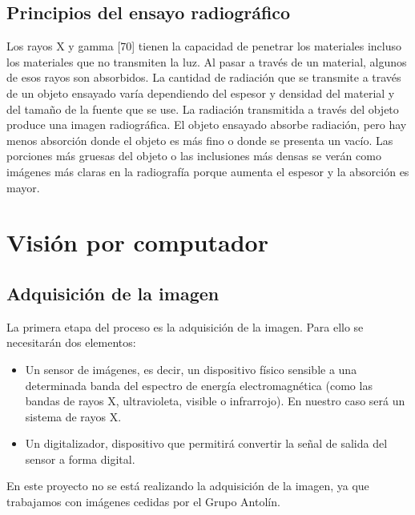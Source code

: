 \subsection{Principios del ensayo radiográfico}
Los rayos X y gamma [70] tienen la capacidad de penetrar los materiales incluso los materiales que no transmiten la luz. Al pasar a través de un material, algunos de esos rayos son absorbidos. La cantidad de radiación que se transmite a través de un objeto ensayado varía dependiendo del espesor y densidad del material y del tamaño de la fuente que se use. La radiación transmitida a través del objeto produce una imagen radiográfica. El objeto ensayado absorbe radiación, pero hay menos absorción donde el objeto es más fino o donde se presenta un vacío. Las porciones más gruesas del objeto o las inclusiones más densas se verán como imágenes más claras en la radiografía porque aumenta el espesor y la absorción es mayor.


\section{Visión por computador}

\subsection{Adquisición de la imagen}\label{adquisicion}
La primera etapa del proceso es la adquisición de la imagen. Para ello se necesitarán dos elementos:

\begin{itemize}

\item Un sensor de imágenes, es decir, un dispositivo físico sensible a una determinada banda del espectro de energía electromagnética (como las bandas de rayos X, ultravioleta, visible o
infrarrojo). En nuestro caso será un sistema de rayos X.

\item Un digitalizador, dispositivo que permitirá convertir la señal de salida del sensor a forma digital.

\end{itemize}


En este proyecto no se está realizando la adquisición de la imagen, ya que trabajamos con imágenes cedidas por el Grupo Antolín.


